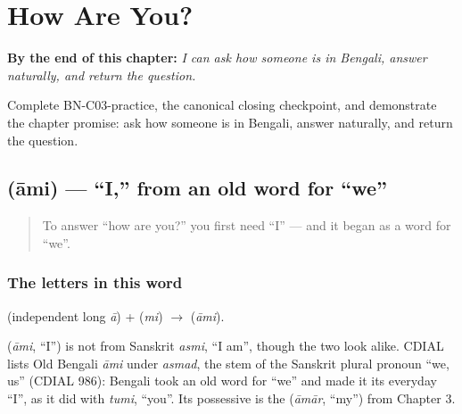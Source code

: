 
\chapter{How Are You?}
\label{ch:responding}

\begin{chapteropening}
\textbf{By the end of this chapter:} \emph{I can ask how someone is in Bengali, answer naturally, and return the question.}

Complete BN-C03-practice, the canonical closing checkpoint, and demonstrate the chapter promise: ask how someone is in Bengali, answer naturally, and return the question.
\end{chapteropening}

\section[\texorpdfstring{\bn{আমি} (āmi)}{আমি (āmi)}]{ (āmi) — \textquotedblleft{}I,\textquotedblright{} from an old word for \textquotedblleft{}we\textquotedblright{}}

\label{lesson:BN-C03-ami}



\begin{quote}
To answer \textquotedblleft{}how are you?\textquotedblright{} you first need \textquotedblleft{}I\textquotedblright{} — and it began as a word for \textquotedblleft{}we\textquotedblright{}.
\end{quote}

\subsection*{The letters in this word}
\textbf{} (independent long \emph{ā}) + \textbf{} (\emph{mi}) $\to$ \textbf{} (\emph{āmi}).

\begin{cousinweb}
\textbf{} (\emph{āmi}, \textquotedblleft{}I\textquotedblright{}) is not from Sanskrit \emph{asmi}, \textquotedblleft{}I am\textquotedblright{}, though the two look alike. CDIAL lists Old Bengali \emph{āmi} under \emph{asmad}, the stem of the Sanskrit plural pronoun \textquotedblleft{}we, us\textquotedblright{} (CDIAL 986): Bengali took an old word for \textquotedblleft{}we\textquotedblright{} and made it its everyday \textquotedblleft{}I\textquotedblright{}, as it did with \emph{tumi}, \textquotedblleft{}you\textquotedblright{}. Its possessive is the \textbf{} (\emph{āmār}, \textquotedblleft{}my\textquotedblright{}) from Chapter 3.
\end{cousinweb}

